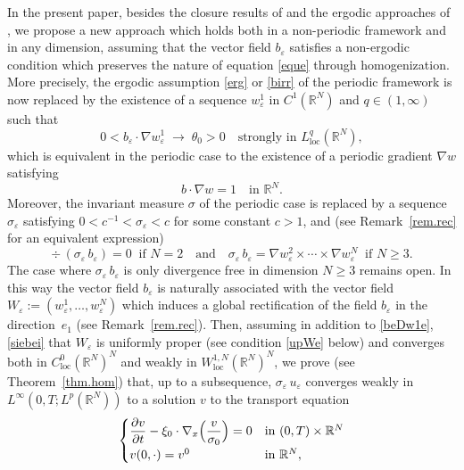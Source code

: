 \documentclass[11pt]{article}
\newcommand{\loc}{\mathrm{loc}}
\def \RR {\mathbb R}
\theoremstyle{plain}
\theoremstyle{definition}
\numberwithin{equation}{section}
\begin{document}
In the present paper, besides the closure results of \cite{AHZ1,AHZ2,AHZ3} and the ergodic approaches of \cite{Bre,HoXi,Gol1,Gol2,Tas}, we propose a new approach which holds both in a non-periodic framework and in any dimension, assuming that the vector field $b_\varepsilon$ satisfies a non-ergodic condition which preserves the nature of equation \eqref{eque} through homogenization.
More precisely, the ergodic assumption \eqref{erg} or \eqref{birr} of the periodic framework
is now replaced by the existence of a sequence $w_\varepsilon^1$ in $C^1(\RR^N)$ and $q\in(1,\infty)$ such that
\begin{equation}\label{beDw1e}
0< b_\varepsilon\cdot\nabla w_\varepsilon^1\;\to\;\theta_0>0\quad\mbox{strongly in }L^q_\loc(\RR^N),
\end{equation}
which is equivalent in the periodic case to the existence of a periodic gradient $\nabla w$ satisfying
\begin{equation}\label{bDw1}
b\cdot\nabla w=1\quad\mbox{in }\RR^N.
\end{equation}
Moreover, the invariant measure $\sigma$ of the periodic case is replaced by a sequence $\sigma_\varepsilon$ satisfying $0<c^{-1}<\sigma_\varepsilon<c$ for some constant $c>1$, and (see Remark~\ref{rem.rec} for an equivalent expression)
\begin{equation}\label{siebei}
\div\,(\sigma_\varepsilon\,b_\varepsilon)=0\;\;\mbox{if }N=2\quad\mbox{and}\quad \sigma_\varepsilon\,b_\varepsilon=\nabla w_\varepsilon^2\times\cdots\times \nabla w_\varepsilon^N\;\;\mbox{if }N\geq 3.
\end{equation}
The case where $\sigma_\varepsilon\,b_\varepsilon$ is only divergence free in dimension $N\geq 3$ remains open.
In this way the vector field $b_\varepsilon$ is naturally associated with the vector field $W_\varepsilon:=(w_\varepsilon^1,\dots, w_\varepsilon^N)$ which induces a global rectification of the field $b_\varepsilon$ in the direction~$e_1$ (see Remark~\ref{rem.rec}). Then, assuming in addition to \eqref{beDw1e}, \eqref{siebei} that $W_\varepsilon$ is uniformly proper (see condition \eqref{upWe} below) and converges both in $C^0_\loc(\RR^N)^N$ and weakly in $W^{1,N}_\loc(\RR^N)^N$, we prove (see Theorem~\ref{thm.hom}) that, up to a subsequence, $\sigma_\varepsilon\,u_\varepsilon$ converges weakly in $L^\infty(0,T;L^p(\RR^N))$ to a solution $v$ to the transport equation
\begin{equation}\label{eqvi}
\begin{cases}
\dfrac{\partial v}{\partial t}-\xi_0\cdot\nabla_x\Bigl(\dfrac{v}{\sigma_0}\Bigr)=0 & \mbox{in }(0,T)\times\RR^N
\\[5pt]
v(0,\cdot)=v^0 & \mbox{in }\RR^N,
\end{cases}
\end{equation}
\end{document}
